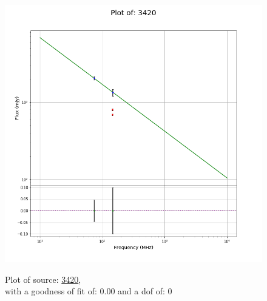 \documentclass{article}
\begin{document}
\begin{figure}[H]
    \centering
    \begin{minipage}{.5\textwidth}
        \centering
        \includegraphics[scale = 0.35]{KmeulenSimSource_1hr/1hr3420.png}
        \captionsetup{labelformat=empty}
        \caption{Plot of source: \href{http://banana.transientskp.org/r4/vlo_KmeulenSimSource/runningcatalog/3420}{3420},\\with a goodness of fit of: 0.00 and a dof of: 0}
        \addtocounter{figure}{-1}
        \label{KmeulenSimSource:1hr:3420:plot}
    \end{minipage}%
    \begin{minipage}{0.5\textwidth}
        \centering


\end{minipage}
\end{figure}
\end{document}
